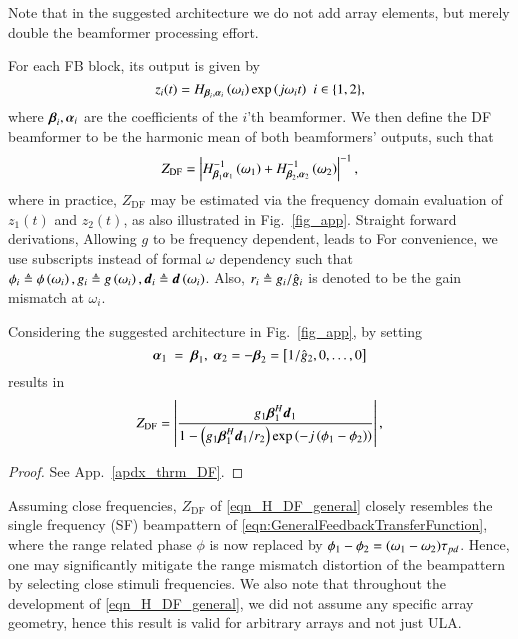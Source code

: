 Note that in the suggested architecture we do not add array elements, but merely double the beamformer processing effort. 
\par For each FB block, its output is given by
\[
z_{i}(t)=H_{\vBetaI{i},\vAlphaI{i}}\rBrace{\omega_{i}}\exp{\rBrace{j\omega_{i}t}}\ \ {i\in\cBrace{1,2}},
\]
where $\boldsymbol{\beta}_{i},\boldsymbol{\alpha}_{i}$ are the coefficients of the $i$'th beamformer. 
We then define the DF beamformer to be the harmonic mean of both beamformers' outputs, such that
\begin{equation}
    \label{eqn_HDF_def}
    Z_{\text{DF}} = \abs{H^{-1}_{\vBetaI{1}\vAlphaI{1}}\rBrace{\omega_{1}}+H^{-1}_{\vBetaI{2},\vAlphaI{2}}\rBrace{\omega_{2}}}^{-1},
\end{equation}
where in practice, $Z_{\text{DF}}$ may be estimated via the frequency domain evaluation of $z_1(t)$ and $z_2(t)$, as also illustrated in Fig.~\ref{fig_app}.
\ifdefined\useOmega
Straight forward derivations, Allowing $g$ to be frequency dependent, leads to
\else
For convenience, we use subscripts instead of formal $\omega$ dependency such that $\phi_{i}\triangleq\phi\left({\omega_{i}}\right), g_{i}\triangleq{}g\left({\omega_{i}}\right), \boldsymbol{d}_{i}\triangleq\boldsymbol{d}\left({\omega_{i}}\right)$.
Also, $r_i\triangleq{}g_{i}/\hat{g}_{i}$ is denoted to be the gain mismatch at $\omega_i$.


\begin{theorem}
\label{thrm_DF}
Considering the suggested architecture in Fig.~\ref{fig_app}, by setting 
\begin{equation}\label{eqn_simpleBeta}
    \vAlphaI{1}~=~\vBetaI{1},\ \vAlphaI{2}=-\vBetaI{2}=\vBrace{1/\gIHat{2},0,\hdots,0}
\end{equation}
results in 
\begin{equation}
    Z_{\text{DF}} = \lBrace{\frac{\gI{1}\vBetaHI{1}\vdI{1}}{1-
    \rBrace{\gI{1}\vBetaHI{1}\vdI{1}/r_{2}}\exp\rBrace{-j\rBrace{\phiI{1}-\phiI{2}}}
    }},
    \label{eqn_H_DF_general}
\end{equation}
\end{theorem}

\begin{proof}
See App.~\ref{apdx_thrm_DF}. 
\end{proof}
\par Assuming close frequencies, $Z_{\text{DF}}$ of  \eqref{eqn_H_DF_general} closely resembles the single frequency (SF) beampattern of  \eqref{eqn:GeneralFeedbackTransferFunction}, where the range related phase $\phi$ is now replaced by  $\phi_{1}-\phi_{2}=(\omega_1-\omega_2)\tau_{pd}$. 
Hence, one may significantly mitigate the range mismatch distortion of the beampattern by selecting close stimuli frequencies.
We also note that throughout the development of \eqref{eqn_H_DF_general}, we did not assume any specific array geometry, hence this result is valid for arbitrary arrays and not just ULA.
